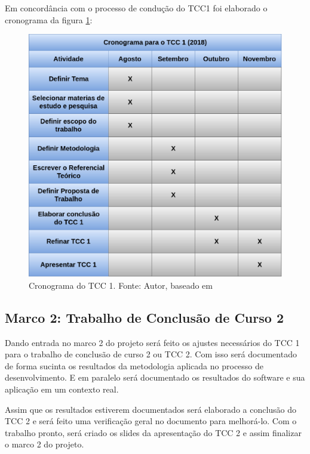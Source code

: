 Em concordância com o processo de condução do TCC1 foi elaborado o cronograma da figura \ref{fig:cronograma_tcc1}:

\begin{figure}[!ht]
	\centering
  \includegraphics[keepaspectratio=true,scale=0.4]{figuras/cronograma_tcc1.eps}
  \caption[Cronograma do TCC 1.]{Cronograma do TCC 1. Fonte: Autor, baseado em \cite{leonardo}}
	\label{fig:cronograma_tcc1}
\end{figure}

\subsection{Marco 2: Trabalho de Conclusão de Curso 2}

Dando entrada no marco 2 do projeto será feito os ajustes necessários do TCC 1 para o trabalho de conclusão de curso 2 ou TCC 2. Com isso será documentado de forma sucinta os resultados da metodologia aplicada no processo de desenvolvimento. E em paralelo será documentado os resultados do software e sua aplicação em um contexto real.

Assim que os resultados estiverem documentados será elaborado a conclusão do TCC 2 e será feito uma verificação geral no documento para melhorá-lo. Com o trabalho pronto, será criado os slides da apresentação do TCC 2 e assim finalizar o marco 2 do projeto.

